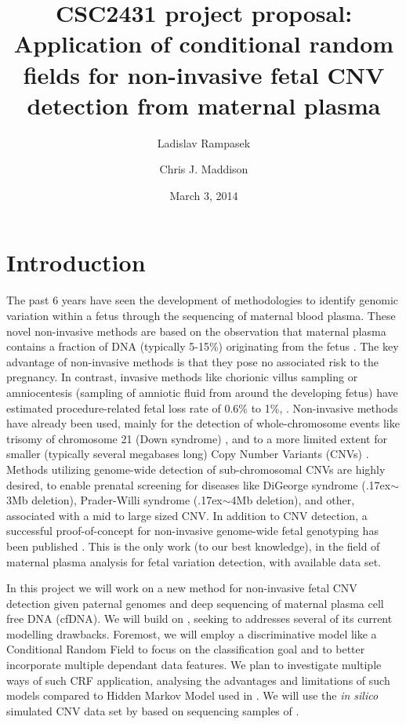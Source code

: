 \documentclass[11pt]{article}
\title{CSC2431 project proposal:\\Application of conditional random fields for non-invasive fetal CNV detection from maternal plasma}
\date{March 3, 2014}
\author{Ladislav Rampasek \and Chris J. Maddison}
\newcommand{\ntilde}{\raise.17ex\hbox{$\scriptstyle\mathtt{\sim}$}}
\begin{document}
\maketitle

\section{Introduction}
The past 6 years have seen the development of methodologies to identify genomic variation within a fetus through the sequencing of maternal blood plasma. These novel non-invasive methods are based on the observation that maternal plasma contains a fraction of DNA (typically 5-15\%) originating from the fetus \citep{lo1997presence}. The key advantage of non-invasive methods is that they pose no associated risk to the pregnancy. In contrast, invasive methods like chorionic villus sampling or amniocentesis (sampling of amniotic fluid from around the developing fetus) have estimated procedure-related fetal loss rate of 0.6\% to 1\%, \cite{douglas2007amnio}. Non-invasive methods have already been used, mainly for the detection of whole-chromosome events like trisomy of chromosome 21 (Down syndrome) \citep{chiu2008noninvasive, fan2008noninvasive}, and to a more limited extent for smaller (typically several megabases long) Copy Number Variants (CNVs) \citep{chen2013, srinivasan2013, rampasek2014fcnv}. Methods utilizing genome-wide detection of sub-chromosomal CNVs are highly desired, to enable prenatal screening for diseases like DiGeorge syndrome (\ntilde3Mb deletion), Prader-Willi syndrome (\ntilde4Mb deletion), and other, associated with a mid to large sized CNV. In addition to CNV detection, a successful proof-of-concept for non-invasive genome-wide fetal genotyping has been published \citep{kitzman2012}. This is the only work (to our best knowledge), in the field of maternal plasma analysis for fetal variation detection, with available data set.

In this project we will work on a new method for non-invasive fetal CNV detection given paternal genomes and deep sequencing of maternal plasma cell free DNA (cfDNA). We will build on \citep{rampasek2014fcnv}, seeking to addresses several of its current modelling drawbacks. Foremost, we will employ a discriminative model like a Conditional Random Field to focus on the classification goal and to better incorporate multiple dependant data features. We plan to investigate multiple ways of such CRF application, analysing the advantages and limitations of such models compared to Hidden Markov Model used in \citep{rampasek2014fcnv}. We will use the \textit{in silico} simulated CNV data set by \citep{rampasek2014fcnv} based on sequencing samples of \citep{kitzman2012}.
\end{document}
